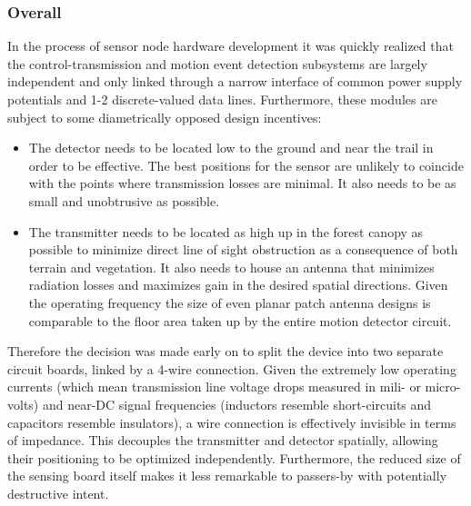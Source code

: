 \documentclass[10pt,nocopyrightspace]{ewsn-proc}
\begin{document}
\subsubsection{Overall}
In the process of sensor node hardware development it was quickly realized that the control-transmission and motion event detection subsystems are largely independent and only linked through a narrow interface of common power supply potentials and 1-2 discrete-valued data lines. Furthermore, these modules are subject to some diametrically opposed design incentives:

\begin{itemize}
\item The detector needs to be located low to the ground and near the trail in order to be effective. The best positions for the sensor are unlikely to coincide with the points where transmission losses are minimal.  It also needs to be as small and unobtrusive as possible.
\item The transmitter needs to be located as high up in the forest canopy as possible to minimize direct line of sight obstruction as a consequence of both terrain and vegetation. It also needs to house an antenna that minimizes radiation losses and maximizes gain in the desired spatial directions. Given the operating frequency the size of even planar patch antenna designs is comparable to the floor area taken up by the entire motion detector circuit.
\end{itemize}

Therefore the decision was made early on to split the device into two separate circuit boards, linked by a 4-wire connection. Given the extremely low operating currents (which mean transmission line voltage drops measured in mili- or micro- volts) and near-DC signal frequencies (inductors resemble short-circuits and capacitors resemble insulators), a wire connection is effectively invisible in terms of impedance. This decouples the transmitter and detector spatially, allowing their positioning to be optimized independently. Furthermore, the reduced size of the sensing board itself makes it less remarkable to passers-by with potentially destructive intent.
\end{document}
